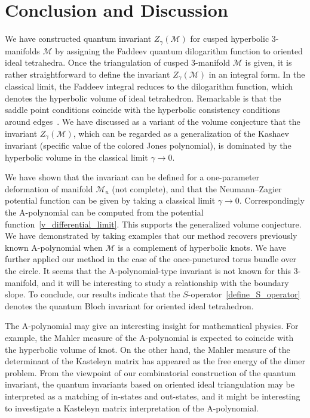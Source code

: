 \documentclass[12pt,reqno]{amsart}
\numberwithin{equation}{section}
\begin{document}
\section{Conclusion and Discussion}


We have constructed  quantum invariant
$Z_\gamma(\mathcal{M})$
for cusped hyperbolic
3-manifolds $\mathcal{M}$
by assigning the Faddeev quantum dilogarithm function to oriented
ideal tetrahedra.
Once the triangulation of cusped 3-manifold $\mathcal{M}$ is given, it
is rather
straightforward to define the invariant $Z_\gamma(\mathcal{M})$ in an
integral form.
In the classical limit, the Faddeev integral reduces to the
dilogarithm function, which denotes the hyperbolic volume of ideal
tetrahedron.
Remarkable is that
the saddle point conditions coincide with the hyperbolic
consistency conditions around edges~\cite{Hikam00d}.
We have discussed as a variant of the volume conjecture
that the invariant
$Z_\gamma(\mathcal{M})$, which can be regarded as a generalization of
the Kashaev invariant (specific value of the colored Jones polynomial),
is dominated by the hyperbolic volume  in the classical limit
$\gamma\to 0$.


We have shown  that the invariant
can be defined for a one-parameter  deformation 
of  manifold $\mathcal{M}_u$ (not complete),
and that the Neumann--Zagier potential function can be given by taking
a classical limit $\gamma\to 0$.
Correspondingly the A-polynomial can be computed from the potential
function~\eqref{v_differential_limit}.
This  supports  the generalized volume conjecture.
We have demonstrated by taking examples
that our method recovers
previously known A-polynomial when $\mathcal{M}$ is a complement of
hyperbolic knots.
We have further  applied our method  in the case of the once-punctured torus bundle over
the circle.
It seems that the A-polynomial-type invariant is not known for this
3-manifold,
and  it will be interesting to study a relationship with the boundary slope.
To conclude,
our results indicate that the $S$-operator~\eqref{define_S_operator}
denotes the quantum Bloch
invariant for oriented ideal tetrahedron.

The A-polynomial may give an interesting insight for mathematical
physics.
For example, the Mahler measure of the A-polynomial is expected to
coincide with
the hyperbolic volume of knot.
On the other hand, the Mahler measure of the determinant of the
Kasteleyn matrix has appeared as the free energy
of the dimer problem.
From the viewpoint of our combinatorial
construction of the quantum invariant,
the quantum invariants based on
oriented ideal triangulation may be interpreted  as a matching of
in-states and out-states, and it might be interesting to investigate a
Kasteleyn matrix interpretation of the A-polynomial.
\end{document}
